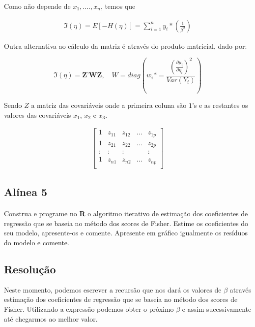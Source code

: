 \documentclass{article}
\begin{document}
			Como não depende de $x_{1}, ...., x_{n}$, temos que 

			\begin{align*}
				\Im(\eta)=E[-H(\eta)] = \sum_{i=1}^{n}y_{i} * \left(\frac{1}{\beta^2}\right)
			\end{align*}

			Outra alternativa ao cálculo da matriz é através do produto matricial, dado por:

			\begin{equation*}
				\Im(\eta)=\textbf{Z'WZ}, \quad W = diag \left(w_i* = \frac{\left(\frac{\partial \mu_i}{\partial \eta_i}\right)^2}{Var (Y_i)}\right)
			\end{equation*}

			Sendo $Z$ a matriz das covariáveis onde a primeira coluna são $1$'s e as restantes os valores das covariáveis $x_1$, $x_2$ e $x_3$.
			
			\begin{align*}
				\begin{bmatrix} 
					1 & z_{11} & z_{12} & ... & z_{1p}\\
					1 & z_{21} & z_{22} & ... & z_{2p}\\
					: & : & : & & :\\
					1 & z_{n1} & z_{n2} & ... & z_{np}\\
				\end{bmatrix}
			\end{align*}

\newpage

		\subsection*{Alínea 5}
			\paragraph{}
				Construa e programe no \textbf{R} o algoritmo iterativo de estimação dos coeficientes de regressão que se baseia no método dos scores de Fisher. Estime os coeficientes do seu modelo, apresente-os e comente. Apresente em gráfico igualmente os resíduos do modelo e comente.

			\subsection*{Resolução}
				
			Neste momento, podemos escrever a recursão que nos dará os valores de $\beta$ através estimação dos coeficientes de regressão que se baseia no método dos scores de Fisher. Utilizando a expressão podemos obter o próximo $\beta$ e assim sucessivamente até chegarmos ao melhor valor.
			
\end{document}
